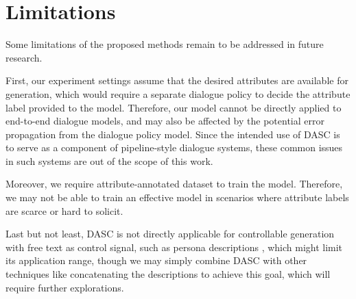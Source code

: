 \section*{Limitations}
Some limitations of the proposed methods remain to be addressed 
in future research. 

First, our experiment settings assume that the desired attributes are available for generation, which would require a separate dialogue policy to decide the 
attribute label provided to the model. Therefore, our model cannot be 
directly applied to end-to-end dialogue models, and may also be affected by 
the potential error propagation from the dialogue policy model. Since the intended use of DASC is to serve as a component of pipeline-style dialogue systems, these common issues in such systems are out of the scope of this work. 

Moreover, we require attribute-annotated dataset to train the model. Therefore, we may not be able to train an effective model in scenarios where attribute labels are scarce or hard to solicit.

Last but not least, DASC is not directly applicable for controllable generation with free text as control signal, such as persona descriptions \cite{zhang2018personalizing}, which might limit its application range, though we may simply combine DASC with other techniques like concatenating the descriptions to achieve this goal, which will require further explorations. 
